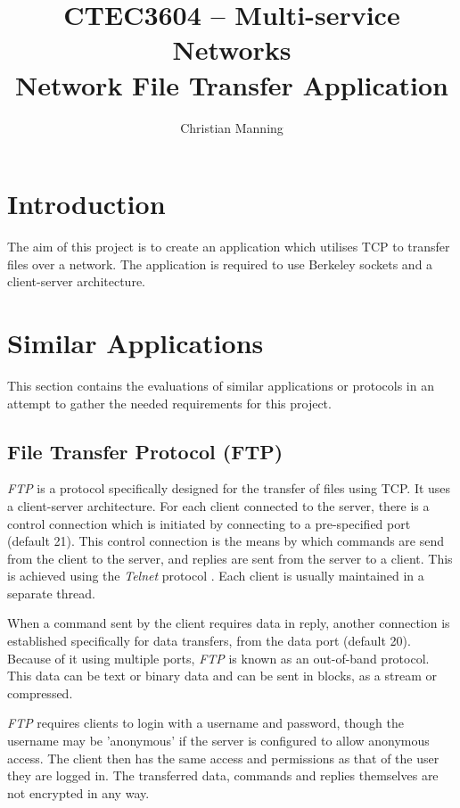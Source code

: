 \documentclass[a4paper]{article}
\title{CTEC3604 -- Multi-service Networks\\
Network File Transfer Application}
\author{Christian Manning}
\begin{document}
\maketitle

\tableofcontents

\pagebreak

\section{Introduction}

The aim of this project is to create an application which utilises TCP to transfer files over a network. The application is required to use Berkeley sockets and a client-server architecture.


\section{Similar Applications}

This section contains the evaluations of similar applications or protocols in an attempt to gather the needed requirements for this project.

\subsection{File Transfer Protocol (FTP)}

\textit{FTP} \cite{rfc959} is a protocol specifically designed for the transfer of files using TCP. It uses a client-server architecture. For each client connected to the server, there is a control connection which is initiated by connecting to a pre-specified port (default 21). This control connection is the means by which commands are send from the client to the server, and replies are sent from the server to a client. This is achieved using the \textit{Telnet} protocol \cite{rfc854}. Each client is usually maintained in a separate thread.

When a command sent by the client requires data in reply, another connection is established specifically for data transfers, from the data port (default 20). Because of it using multiple ports, \textit{FTP} is known as an out-of-band protocol. This data can be text or binary data and can be sent in blocks, as a stream or compressed.

\textit{FTP} requires clients to login with a username and password, though the username may be 'anonymous' if the server is configured to allow anonymous access. The client then has the same access and permissions as that of the user they are logged in. The transferred data, commands and replies themselves are not encrypted in any way.
\end{document}
